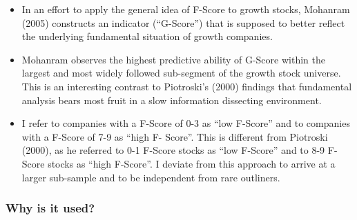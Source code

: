 \documentclass[12pt]{article}
\begin{document}
\begin{itemize}
            \item In an effort to apply the general idea of F-Score to growth stocks, Mohanram (2005) constructs an indicator (“G-Score”) that is supposed to better reflect the underlying fundamental situation of growth companies. \citep{Mohr2012}

            \item Mohanram observes the highest predictive ability of G-Score within the largest and most widely followed sub-segment of the growth stock universe. This is an interesting contrast to Piotroski’s (2000) findings that fundamental analysis bears most fruit in a slow information dissecting environment. \citep{Mohr2012}

            \item I refer to companies with a F-Score of 0-3 as “low F-Score” and to companies with a F-Score of 7-9 as “high F- Score”. This is different from Piotroski (2000), as he referred to 0-1 F-Score stocks as “low F-Score” and to 8-9 F-Score stocks as “high F-Score”. I deviate from this approach to arrive at a larger sub-sample and to be independent from rare outliners. \citep{Mohr2012}


        \end{itemize}

    \subsubsection{Why is it used?}
\end{document}
